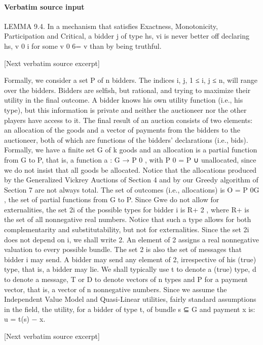\documentclass[10pt]{article}
\begin{document}
\paragraph{Verbatim source input}
\begin{ReviewVerbatim}
LEMMA 9.4. In a mechanism that satisfies Exactness, Monotonicity, Participation and Critical, a bidder j of type hs, vi is never better off declaring hs, v 0 i for
some v 0 6= v than by being truthful.

[Next verbatim source excerpt]

Formally, we consider a set P of n bidders. The indices i, j, 1 ≤ i, j ≤ n, will
range over the bidders. Bidders are selfish, but rational, and trying to maximize their
utility in the final outcome. A bidder knows his own utility function (i.e., his type),
but this information is private and neither the auctioneer nor the other players have
access to it. The final result of an auction consists of two elements: an allocation
of the goods and a vector of payments from the bidders to the auctioneer, both of
which are functions of the bidders’ declarations (i.e., bids). Formally, we have a
finite set G of k goods and an allocation is a partial function from G to P, that is, a
function a : G → P 0 , with P 0 = P ∪ {unallocated}, since we do not insist that all
goods be allocated. Notice that the allocations produced by the Generalized Vickrey
Auctions of Section 4 and by our Greedy algorithm of Section 7 are not always
total. The set of outcomes (i.e., allocations) is O = P 0G , the set of partial functions
from G to P. Since Gwe do not allow for externalities, the set 2i of the possible types
for bidder i is R+ 2 , where R+ is the set of all nonnegative real numbers. Notice
that such a type allows for both complementarity and substitutability, but not for
externalities. Since the set 2i does not depend on i, we shall write 2. An element
of 2 assigns a real nonnegative valuation to every possible bundle. The set 2 is
also the set of messages that bidder i may send. A bidder may send any element of
2, irrespective of his (true) type, that is, a bidder may lie. We shall typically use t
to denote a (true) type, d to denote a message, T or D to denote vectors of n types
and P for a payment vector, that is, a vector of n nonnegative numbers.
Since we assume the Independent Value Model and Quasi-Linear utilities, fairly
standard assumptions in the field, the utility, for a bidder of type t, of bundle s ⊆ G
and payment x is:
u = t(s) − x.

[Next verbatim source excerpt]


\end{ReviewVerbatim}
\end{document}
